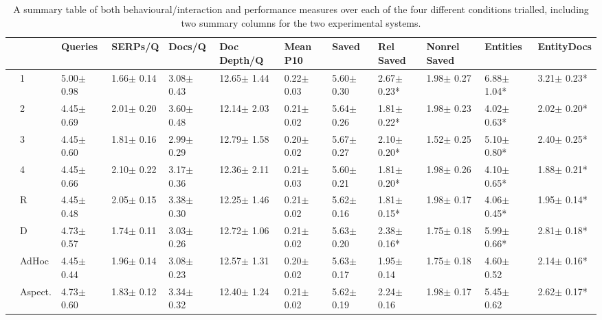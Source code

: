 \begin{table*}[t]
    \caption{A summary table of both behavioural/interaction and performance measures over each of the four different conditions trialled, including two summary columns for the two experimental systems. }
    \label{tbl_actions}
    \renewcommand{\arraystretch}{1.4}
    \begin{center}
    \begin{tabulary}{\textwidth}{L{0.1cm}D{1.0cm}|D{1.2cm}|D{1.2cm}|D{1.2cm}|D{1.2cm}|D{1.2cm}|D{1.2cm}|D{1.2cm}|D{1.2cm}|D{1.2cm}|D{1.2cm}}
    \hline
    
    & & Queries & SERPs/Q & Docs/Q & Doc Depth/Q & Mean P10 & Saved & Rel Saved & Nonrel Saved & Entities & EntityDocs \\ \hline\hline
    
     & 1 & 5.00$\pm$ 0.98 & 1.66$\pm$ 0.14 & 3.08$\pm$ 0.43 & 12.65$\pm$ 1.44 & 0.22$\pm$ 0.03 & 5.60$\pm$ 0.30 & 2.67$\pm$ 0.23* & 1.98$\pm$ 0.27 & 6.88$\pm$ 1.04* & 3.21$\pm$ 0.23*\\ \hline
& 2 & 4.45$\pm$ 0.69 & 2.01$\pm$ 0.20 & 3.60$\pm$ 0.48 & 12.14$\pm$ 2.03 & 0.21$\pm$ 0.02 & 5.64$\pm$ 0.26 & 1.81$\pm$ 0.22* & 1.98$\pm$ 0.23 & 4.02$\pm$ 0.63* & 2.02$\pm$ 0.20*\\ \hline
& 3 & 4.45$\pm$ 0.60 & 1.81$\pm$ 0.16 & 2.99$\pm$ 0.29 & 12.79$\pm$ 1.58 & 0.20$\pm$ 0.02 & 5.67$\pm$ 0.27 & 2.10$\pm$ 0.20* & 1.52$\pm$ 0.25 & 5.10$\pm$ 0.80* & 2.40$\pm$ 0.25*\\ \hline
& 4 & 4.45$\pm$ 0.66 & 2.10$\pm$ 0.22 & 3.17$\pm$ 0.36 & 12.36$\pm$ 2.11 & 0.21$\pm$ 0.03 & 5.60$\pm$ 0.21 & 1.81$\pm$ 0.20* & 1.98$\pm$ 0.26 & 4.10$\pm$ 0.65* & 1.88$\pm$ 0.21*\\ \hline\hline

     & R & 4.45$\pm$ 0.48 & 2.05$\pm$ 0.15 & 3.38$\pm$ 0.30 & 12.25$\pm$ 1.46 & 0.21$\pm$ 0.02 & 5.62$\pm$ 0.16 & 1.81$\pm$ 0.15* & 1.98$\pm$ 0.17 & 4.06$\pm$ 0.45* & 1.95$\pm$ 0.14*\\ \hline
& D & 4.73$\pm$ 0.57 & 1.74$\pm$ 0.11 & 3.03$\pm$ 0.26 & 12.72$\pm$ 1.06 & 0.21$\pm$ 0.02 & 5.63$\pm$ 0.20 & 2.38$\pm$ 0.16* & 1.75$\pm$ 0.18 & 5.99$\pm$ 0.66* & 2.81$\pm$ 0.18*\\ \hline\hline

     & AdHoc & 4.45$\pm$ 0.44 & 1.96$\pm$ 0.14 & 3.08$\pm$ 0.23 & 12.57$\pm$ 1.31 & 0.20$\pm$ 0.02 & 5.63$\pm$ 0.17 & 1.95$\pm$ 0.14 & 1.75$\pm$ 0.18 & 4.60$\pm$ 0.52 & 2.14$\pm$ 0.16*\\ \hline
& Aspect. & 4.73$\pm$ 0.60 & 1.83$\pm$ 0.12 & 3.34$\pm$ 0.32 & 12.40$\pm$ 1.24 & 0.21$\pm$ 0.02 & 5.62$\pm$ 0.19 & 2.24$\pm$ 0.16 & 1.98$\pm$ 0.17 & 5.45$\pm$ 0.62 & 2.62$\pm$ 0.17*\\ \hline
    
    
    \end{tabulary}
    \end{center}
\end{table*}

